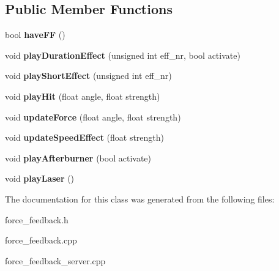 \subsection*{Public Member Functions}
\begin{DoxyCompactItemize}
\item 
bool {\bfseries have\+FF} ()\hypertarget{classForceFeedback_a13f76af136b6e8ddbeaed3fbd357572f}{}\label{classForceFeedback_a13f76af136b6e8ddbeaed3fbd357572f}

\item 
void {\bfseries play\+Duration\+Effect} (unsigned int eff\+\_\+nr, bool activate)\hypertarget{classForceFeedback_a414c080346c8dbc07d89922e08b905e2}{}\label{classForceFeedback_a414c080346c8dbc07d89922e08b905e2}

\item 
void {\bfseries play\+Short\+Effect} (unsigned int eff\+\_\+nr)\hypertarget{classForceFeedback_ad1b9c9b26a0e1403394cb1f12145626d}{}\label{classForceFeedback_ad1b9c9b26a0e1403394cb1f12145626d}

\item 
void {\bfseries play\+Hit} (float angle, float strength)\hypertarget{classForceFeedback_a35826febd8fd7a9df56f16b46612b81c}{}\label{classForceFeedback_a35826febd8fd7a9df56f16b46612b81c}

\item 
void {\bfseries update\+Force} (float angle, float strength)\hypertarget{classForceFeedback_ae49dfc9a5d483107e8acabc59d2c6d78}{}\label{classForceFeedback_ae49dfc9a5d483107e8acabc59d2c6d78}

\item 
void {\bfseries update\+Speed\+Effect} (float strength)\hypertarget{classForceFeedback_a85af7db22ad23fce68b440c3131204b9}{}\label{classForceFeedback_a85af7db22ad23fce68b440c3131204b9}

\item 
void {\bfseries play\+Afterburner} (bool activate)\hypertarget{classForceFeedback_ad23b79db6784d17f0a5afd2833596a53}{}\label{classForceFeedback_ad23b79db6784d17f0a5afd2833596a53}

\item 
void {\bfseries play\+Laser} ()\hypertarget{classForceFeedback_a1c34a7e517eadea331cdf2533463f9a3}{}\label{classForceFeedback_a1c34a7e517eadea331cdf2533463f9a3}

\end{DoxyCompactItemize}


The documentation for this class was generated from the following files\+:\begin{DoxyCompactItemize}
\item 
force\+\_\+feedback.\+h\item 
force\+\_\+feedback.\+cpp\item 
force\+\_\+feedback\+\_\+server.\+cpp\end{DoxyCompactItemize}
